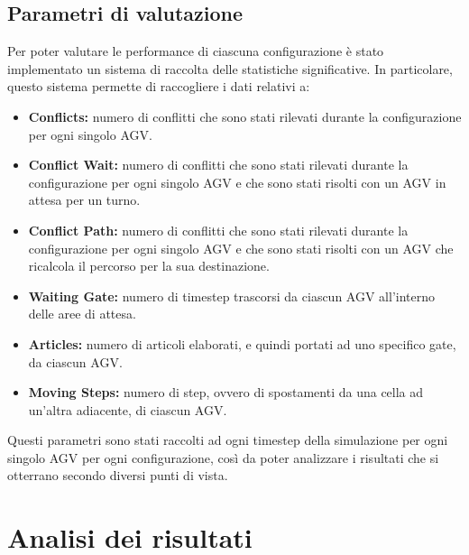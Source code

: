 \documentclass[12pt]{article}
\begin{document}
\newpage

\subsection{Parametri di valutazione}
Per poter valutare le performance di ciascuna configurazione è stato implementato un sistema di raccolta delle statistiche significative. In particolare, questo sistema permette di raccogliere i dati relativi a:

\begin{itemize}
    \item \textbf{Conflicts:} numero di conflitti che sono stati rilevati durante la configurazione per ogni singolo AGV.
    \item \textbf{Conflict Wait:} numero di conflitti che sono stati rilevati durante la configurazione per ogni singolo AGV e che sono stati risolti con un AGV in attesa per un turno.
    \item \textbf{Conflict Path:} numero di conflitti che sono stati rilevati durante la configurazione per ogni singolo AGV e che sono stati risolti con un AGV che ricalcola il percorso per la sua destinazione.
    \item \textbf{Waiting Gate:} numero di timestep trascorsi da ciascun AGV all'interno delle aree di attesa.
    \item \textbf{Articles:}  numero di articoli elaborati, e quindi portati ad uno specifico gate, da ciascun AGV.
    \item \textbf{Moving Steps:} numero di step, ovvero di spostamenti da una cella ad un'altra adiacente, di ciascun AGV.
\end{itemize}

Questi parametri sono stati raccolti ad ogni timestep della simulazione per ogni singolo AGV per ogni configurazione, così da poter analizzare i risultati che si otterrano secondo diversi punti di vista.


\newpage
\section{Analisi dei risultati}
\end{document}
